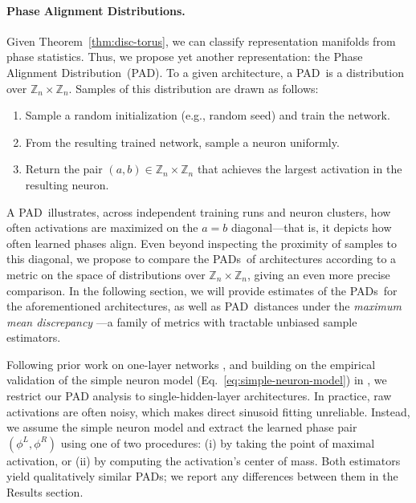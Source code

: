 \documentclass{article} %
\newcommand{\diagplot}{Phase Alignment Distribution}
\newcommand{\diagplots}{Phase Alignment Distributions}
\newcommand{\diagplotacr}{PAD}
\newcommand{\diagplotacrs}{PADs}
\theoremstyle{plain}
\theoremstyle{definition}
\newtheorem{empirical fact}[theorem]{Empirical Fact}
\begin{document}
\paragraph{\diagplots.} Given Theorem~\ref{thm:disc-torus}, we can classify representation manifolds from phase statistics. Thus, we propose yet another representation: the \diagplot\, (\diagplotacr).
To a given architecture, a \diagplotacr\, is a distribution over $\mathbb{Z}_n\times\mathbb{Z}_n$. Samples of this distribution are drawn as follows:
\begin{enumerate}
    \item Sample a random initialization (e.g., random seed) and train the network.
    \item From the resulting trained network, sample a neuron uniformly.
    \item Return the pair $(a, b)\in\mathbb{Z}_n\times\mathbb{Z}_n$ that achieves the largest activation in the resulting neuron.
\end{enumerate}
A \diagplotacr\, illustrates, across independent training runs and neuron clusters, how often activations are maximized on the $a=b$ diagonal---that is, it depicts how often learned phases align.
Even beyond inspecting the proximity of samples to this diagonal, we propose to compare the \diagplotacrs\, of architectures according to a metric on the space of distributions over $\mathbb{Z}_n\times\mathbb{Z}_n$, giving an even more precise comparison.
In the following section, we will provide estimates of the \diagplotacrs\, for the aforementioned architectures, as well as \diagplotacr\, distances under the \emph{maximum mean discrepancy} \citep[MMD]{gretton2012kernel}---a family of metrics with tractable unbiased sample estimators. 


Following prior work on one-layer networks \citep{nanda2023progress, zhong2023the}, and building on the empirical validation of the simple neuron model (Eq.~\ref{eq:simple-neuron-model}) in \citet{mccracken2025uncoveringuniversalabstractalgorithm}, we restrict our PAD analysis to single-hidden-layer architectures. In practice, raw activations are often noisy, which makes direct sinusoid fitting unreliable. Instead, we assume the simple neuron model and extract the learned phase pair $(\phi^L, \phi^R)$ using one of two procedures: (i) by taking the point of maximal activation, or (ii) by computing the activation’s center of mass. Both estimators yield qualitatively similar PADs; we report any differences between them in the Results section.
\end{document}
